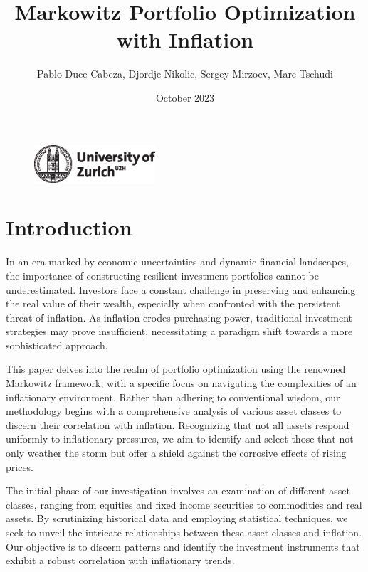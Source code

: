 \documentclass{article}
\title{Markowitz Portfolio Optimization with Inflation}
\author{Pablo Duce Cabeza, Djordje Nikolic, Sergey Mirzoev, Marc Tschudi}
\date{October 2023}
\begin{document}
\maketitle

\begin{figure}[h]
    \centering
    \includegraphics[width=0.4\textwidth]{figure/uzh_logo_e_pos.eps}
    \label{fig:mesh0}
\end{figure}

\newpage
\tableofcontents
\newpage
\listoffigures
\listoftables
\newpage

\section{Introduction}


In an era marked by economic uncertainties and dynamic financial landscapes, the importance of constructing resilient investment portfolios cannot be underestimated. Investors face a constant challenge in preserving and enhancing the real value of their wealth, especially when confronted with the persistent threat of inflation. As inflation erodes purchasing power, traditional investment strategies may prove insufficient, necessitating a paradigm shift towards a more sophisticated approach.

This paper delves into the realm of portfolio optimization using the renowned Markowitz framework, with a specific focus on navigating the complexities of an inflationary environment. Rather than adhering to conventional wisdom, our methodology begins with a comprehensive analysis of various asset classes to discern their correlation with inflation. Recognizing that not all assets respond uniformly to inflationary pressures, we aim to identify and select those that not only weather the storm but offer a shield against the corrosive effects of rising prices.

The initial phase of our investigation involves an examination of different asset classes, ranging from equities and fixed income securities to commodities and real assets. By scrutinizing historical data and employing statistical techniques, we seek to unveil the intricate relationships between these asset classes and inflation. Our objective is to discern patterns and identify the investment instruments that exhibit a robust correlation with inflationary trends.
\end{document}
